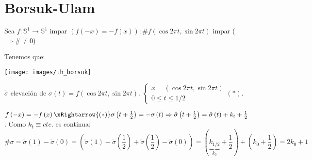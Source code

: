 \section{Borsuk-Ulam}%
\label{sec:borsuk_ulam}
\begin{theo}[de Borsuk]
Sea $f: \mathbb{S}^{1} \rightarrow \mathbb{S}^{1}$ impar $\left( f\left( -x \right) = -f\left( x \right) \right): \# f\left( \cos 2 \pi t, \sin 2 \pi t \right)$ impar ($\Rightarrow \# \neq 0$) 
\end{theo}
\begin{demo}
Tenemos que:
\begin{center}
    \texttt{[image: images/th\_borsuk]} 
\end{center}
$\tilde{\sigma}$ elevación de $\sigma\left( t \right) = f\left( \cos 2 \pi t, \sin 2 \pi t \right)$. $\begin{cases}
    x = \left( \cos 2 \pi t, \sin 2 \pi t \right)\\
    0 \le t \le 1/2
\end{cases} (*)$.

$f\left( -x \right) = -f\left( x \right) \xRightarrow{(*)} \sigma\left( t + \frac{1}{2} \right) = -\sigma\left( t \right) \Rightarrow \tilde{\sigma} \left( t + \frac{1}{2} \right) = \tilde{\sigma} \left( t \right) + k_t + \frac{1}{2}$. Como $k_t \equiv cte.$ es continua:
\[
    \# \sigma = \tilde{\sigma} \left( 1 \right) - \tilde{\sigma} \left( 0 \right) = \left( \tilde{\sigma} \left( 1 \right) - \tilde{\sigma}{\left( \frac{1}{2} \right)} + \tilde{\sigma} \left( \frac{1}{2} \right) - \tilde{\sigma} \left( 0 \right) \right) = \left( \underbrace{k_{1/2}}_{k_0} + \frac{1}{2} \right) + \left( k_0 + \frac{1}{2} \right) = 2k_0 + 1
\]
\end{demo}

